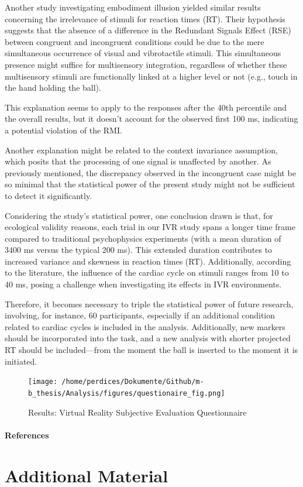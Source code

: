 \documentclass[12pt,oneside,openright]{report}
\begin{document}
Another study investigating embodiment illusion yielded similar results concerning the irrelevance of stimuli for reaction times (RT). Their hypothesis suggests that the absence of a difference in the Redundant Signals Effect (RSE) between congruent and incongruent conditions could be due to the mere simultaneous occurrence of visual and vibrotactile stimuli. This simultaneous presence might suffice for multisensory integration, regardless of whether these multisensory stimuli are functionally linked at a higher level or not (e.g., touch in the hand holding the ball)\parencite{RSE_FBI}.

This explanation seems to apply to the responses after the 40th percentile and the overall results, but it doesn't account for the observed first 100 ms, indicating a potential violation of the RMI.

Another explanation might be related to the context invariance assumption, which posits that the processing of one signal is unaffected by another. As previously mentioned, the discrepancy observed in the incongruent case might be so minimal that the statistical power of the present study might not be sufficient to detect it significantly.

Considering the study's statistical power, one conclusion drawn is that, for ecological validity reasons, each trial in our IVR study spans a longer time frame compared to traditional psychophysics experiments (with a mean duration of 3400 ms versus the typical 200 ms). This extended duration contributes to increased variance and skewness in reaction times (RT). Additionally, according to the literature, the influence of the cardiac cycle on stimuli ranges from 10 to 40 ms, posing a challenge when investigating its effects in IVR environments.

Therefore, it becomes necessary to triple the statistical power of future research, involving, for instance, 60 participants, especially if an additional condition related to cardiac cycles is included in the analysis. Additionally, new markers should be incorporated into the task, and a new analysis with shorter projected RT should be included—from the moment the ball is inserted to the moment it is initiated.  


\newpage
\begin{figure}[H]
        \centering
        \texttt{[image: /home/perdices/Dokumente/Github/m-b\_thesis/Analysis/figures/questionaire\_fig.png]}
        \caption{Results: Virtual Reality Subjective Evaluation Questionnaire}
        \label{fig:quest}
\end{figure}
\pagebreak



\paragraph{\textbf{References}}
\printbibliography[heading=none]


\pagebreak
\vspace*{\fill}
\section*{\centering Additional Material}
\vspace*{\fill}
\end{document}
